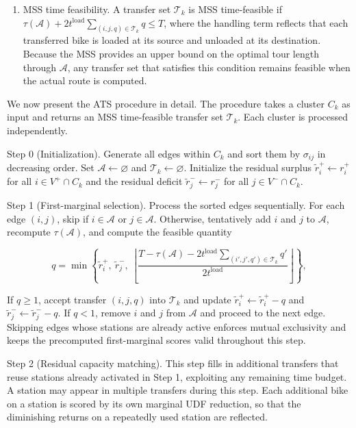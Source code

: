 \documentclass[11pt]{article}
\numberwithin{table}{section}
\numberwithin{figure}{section}
\begin{document}
\begin{enumerate}[label=(\arabic*)]
\item MSS time feasibility. A transfer set ${{\mathcal{T}}_{k}}$ is MSS time-feasible if $\tau (\mathcal{A})+2{{t}^{\text{load}}}\sum\limits_{(i,j,q)\in {{\mathcal{T}}_{k}}}{q}\le T$, where the handling term reflects that each transferred bike is loaded at its source and unloaded at its destination. Because the MSS provides an upper bound on the optimal tour length through $\mathcal{A}$, any transfer set that satisfies this condition remains feasible when the actual route is computed.
\end{enumerate}

We now present the ATS procedure in detail. The procedure takes a cluster ${{C}_{k}}$ as input and returns an MSS time-feasible transfer set ${{\mathcal{T}}_{k}}$. Each cluster is processed independently.

Step 0 (Initialization). Generate all edges within ${{C}_{k}}$ and sort them by ${{\sigma }_{ij}}$ in decreasing order. Set $\mathcal{A}\leftarrow \varnothing $ and ${{\mathcal{T}}_{k}}\leftarrow \varnothing $. Initialize the residual surplus $\tilde{r}_{i}^{+}\leftarrow r_{i}^{+}$ for all $i\in {{V}^{+}}\cap {{C}_{k}}$ and the residual deficit $\tilde{r}_{j}^{-}\leftarrow r_{j}^{-}$ for all $j\in {{V}^{-}}\cap {{C}_{k}}$.

Step 1 (First-marginal selection). Process the sorted edges sequentially. For each edge $(i,j)$, skip if $i\in \mathcal{A}$ or $j\in \mathcal{A}$. Otherwise, tentatively add $i$ and $j$ to $\mathcal{A}$, recompute $\tau (\mathcal{A})$, and compute the feasible quantity

\[
q=\min \left\{ \tilde{r}_{i}^{+},\ \tilde{r}_{j}^{-},\ \left\lfloor \frac{T-\tau (\mathcal{A})-2{{t}^{\text{load}}}\sum\limits_{({i}',{j}',{q}')\in {{\mathcal{T}}_{k}}}{{{q}'}}}{2{{t}^{\text{load}}}} \right\rfloor  \right\},
\]

If $q\ge 1$, accept transfer $(i,j,q)$ into ${{\mathcal{T}}_{k}}$ and update $\tilde{r}_{i}^{+}\leftarrow \tilde{r}_{i}^{+}-q$ and $\tilde{r}_{j}^{-}\leftarrow \tilde{r}_{j}^{-}-q$. If $q<1$, remove $i$ and $j$ from $\mathcal{A}$ and proceed to the next edge. Skipping edges whose stations are already active enforces mutual exclusivity and keeps the precomputed first-marginal scores valid throughout this step.

Step 2 (Residual capacity matching). This step fills in additional transfers that reuse stations already activated in Step 1, exploiting any remaining time budget. A station may appear in multiple transfers during this step. Each additional bike on a station is scored by its own marginal UDF reduction, so that the diminishing returns on a repeatedly used station are reflected.
\end{document}
